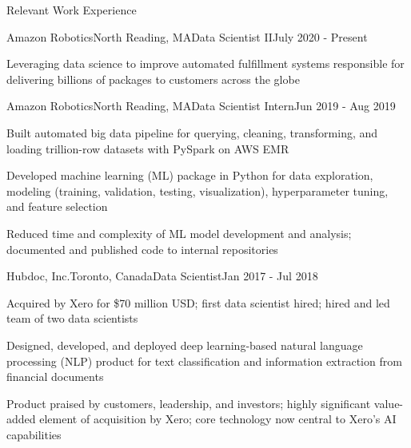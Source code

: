 \documentclass{resume} %
\begin{document}
\begin{rSection}{Relevant Work Experience}


\begin{rSubsection}{Amazon Robotics}{North Reading, MA}{Data Scientist II}{July 2020 - Present}

	\item Leveraging data science to improve automated fulfillment systems responsible for delivering billions of packages to customers across the globe
    
\end{rSubsection}

\begin{rSubsection}{Amazon Robotics}{North Reading, MA}{Data Scientist Intern}{Jun 2019 - Aug 2019}

	\item Built automated big data pipeline for querying, cleaning, transforming, and loading trillion-row datasets with PySpark on AWS EMR
	\item Developed machine learning (ML) package in Python for data exploration, modeling (training, validation, testing, visualization), hyperparameter tuning, and feature selection
	\item Reduced time and complexity of ML model development and analysis; documented and published code to internal repositories
    
\end{rSubsection}


\begin{rSubsection}{Hubdoc, Inc.}{Toronto, Canada}{Data Scientist}{Jan 2017 - Jul 2018}

	\item Acquired by Xero for \$70 million USD; first data scientist hired; hired and led team of two data scientists
	\item Designed, developed, and deployed deep learning-based natural language processing (NLP) product for text classification and information extraction from financial documents
	\item Product praised by customers, leadership, and investors; highly significant value-added element of acquisition by Xero; core technology now central to Xero's AI capabilities
    
\end{rSubsection}


\end{rSection}
\end{document}
